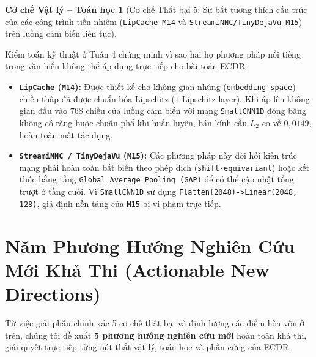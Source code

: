 \documentclass[11pt,a4paper]{article}
\newcommand{\code}[1]{{\small\ttfamily\nolinkurl{#1}}}
\newtheorem{mechanism}{Cơ chế Vật lý -- Toán học}[section]
\begin{document}
\begin{mechanism}[Cơ chế Thất bại 5: Sự bất tương thích cấu trúc của các công trình tiền nhiệm (\code{LipCache M14} và \code{StreamiNNC/TinyDejaVu M15}) trên luồng cảm biến liên tục]
\end{mechanism}
Kiểm toán kỹ thuật ở Tuần 4 chứng minh vì sao hai họ phương pháp nổi tiếng trong văn hiến không thể áp dụng trực tiếp cho bài toán ECDR:
\begin{itemize}
  \item \textbf{\code{LipCache} (\code{M14}):} Được thiết kế cho không gian nhúng (\code{embedding space}) chiều thấp đã được chuẩn hóa Lipschitz ($1$-Lipschitz layer). Khi áp lên không gian đầu vào $768$ chiều của luồng cảm biến với mạng \code{SmallCNN1D} đóng băng không có ràng buộc chuẩn phổ khi huấn luyện, bán kính cầu $L_2$ co về $0,0149$, hoàn toàn mất tác dụng.
  \item \textbf{\code{StreamiNNC / TinyDejaVu} (\code{M15}):} Các phương pháp này đòi hỏi kiến trúc mạng phải hoàn toàn bất biến theo phép dịch (\code{shift-equivariant}) hoặc kết thúc bằng tầng \code{Global Average Pooling (GAP)} để có thể cập nhật tổng trượt ở tầng cuối. Vì \code{SmallCNN1D} sử dụng \code{Flatten(2048)->Linear(2048, 128)}, giả định nền tảng của \code{M15} bị vi phạm trực tiếp.
\end{itemize}

\section{Năm Phương Hướng Nghiên Cứu Mới Khả Thi (Actionable New Directions)}

Từ việc giải phẫu chính xác 5 cơ chế thất bại và định lượng các điểm hòa vốn ở trên, chúng tôi đề xuất \textbf{5 phương hướng nghiên cứu mới} hoàn toàn khả thi, giải quyết trực tiếp từng nút thắt vật lý, toán học và phần cứng của ECDR.
\end{document}
